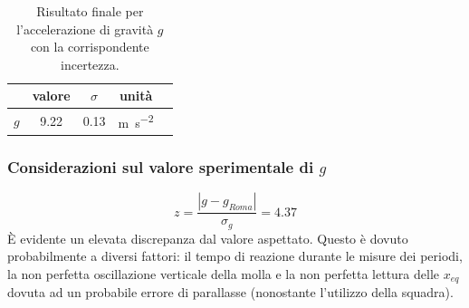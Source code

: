 \documentclass[titlepage]{article}
\numberwithin{equation}{section}
\numberwithin{figure}{section}
\numberwithin{table}{section}
\begin{document}
\pagebreak

\begin{table}[ht]
  \centering
  \begin{tabular}{rcccc}
    \toprule
    & valore & $\sigma$ & unità \\
    \midrule
    $g$ & 9.22 & 0.13 & \si{\metre\per\second\squared} \\
    \bottomrule
  \end{tabular}
  \caption{Risultato finale per l'accelerazione di gravità $g$ con la corrispondente incertezza.}
\end{table}

\subsubsection{Considerazioni sul valore sperimentale di \texorpdfstring{$g$}{g}}

\begin{equation*}
  z = \frac{|g - g_{Roma}|}{\sigma_g} = 4.37
\end{equation*}
È evidente un elevata discrepanza dal valore aspettato. Questo è dovuto probabilmente a diversi fattori: il tempo di reazione durante le misure dei periodi, la non perfetta oscillazione verticale della molla e la non perfetta lettura delle $x_{eq}$ dovuta ad un probabile errore di parallasse (nonostante l'utilizzo della squadra).
\end{document}
